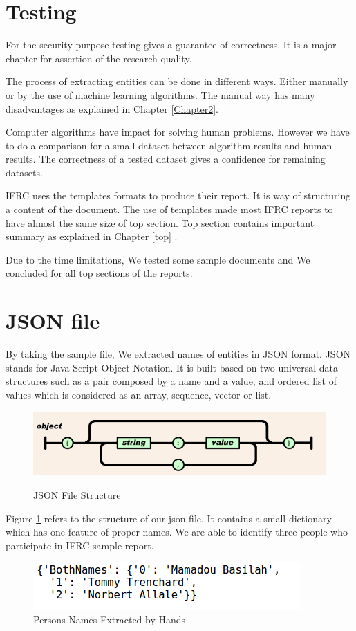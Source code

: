 \newpage
\section{Testing}\label{chp4}
For the security purpose testing gives a guarantee of correctness.  It is a major chapter for assertion of the research quality.

The process of extracting entities can be done in different ways. Either manually or by the use of machine learning algorithms. The manual way has many disadvantages as explained in Chapter \ref{Chapter2}.

Computer algorithms have impact for solving human problems. However we have to do a comparison for a small dataset between algorithm results and human results. The correctness of a tested dataset gives a confidence for remaining datasets.

IFRC uses the templates formats to produce their report. It is way of structuring a content of the document. The use of templates made most IFRC reports to have almost  the same size of top section. Top section contains important summary  as explained in Chapter \ref{top} .

Due to the time limitations, We tested  some  sample documents and We concluded for all top sections of the reports.
\section*{JSON file }
By taking the sample file, We extracted names of entities in JSON format. JSON stands for Java Script Object Notation. It is built based on two universal data structures such as a pair composed by a name and a value, and ordered list of values which is considered as an array, sequence, vector or list.
\begin{figure}[hbtp]
\caption{JSON File Structure \citep{bray2014javascript}}
\centering
\includegraphics[scale=.7]{images/json.png}\label{json}
\end{figure}


Figure \ref{json}
refers to the structure of our json file. It contains a small dictionary which has one feature of proper names. We are able to identify three people who participate in IFRC sample report.
\newpage 
\begin{figure}[hbtp]
\centering
\includegraphics[scale=.7]{images/BothNames.png}
\caption{Persons Names Extracted by Hands}\label{Hand}
\end{figure}

